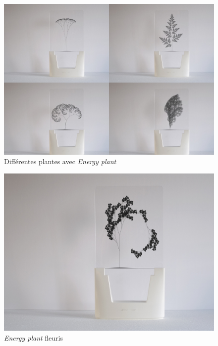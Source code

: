 \documentclass[10pt,a5paper,twoside]{article}
\begin{document}
\begin{figure}
\centering
\includegraphics[]{images/energyplant-screenshot1.jpg}
\caption{Différentes plantes avec \emph{Energy
plant}}\label{fig:energyplant1}
\end{figure}

\begin{figure}
\centering
\includegraphics[]{images/energyplant-screenshot3.jpg}
\caption{\emph{Energy plant} fleuris}\label{fig:energyplant3}
\end{figure}
\end{document}
